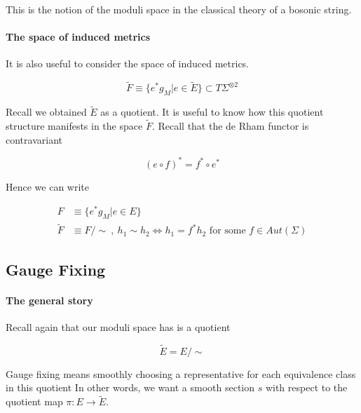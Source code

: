 \documentclass{article}
\begin{document}
            This is the notion of the moduli space in the classical theory of a bosonic string.

        \paragraph{The space of induced metrics} 

            It is also useful to consider the space of induced metrics.

            \begin{equation}
                \tilde F \equiv \{e^* g_M | e \in \tilde E \} \subset T\Sigma^{\otimes 2}
            \end{equation}

            Recall we obtained $\tilde E$ as a quotient. It is useful to know how this quotient structure manifests in the space $\tilde F$. Recall that the de Rham functor is contravariant

            \begin{equation}
                (e \circ f)^* = f^* \circ e^*
            \end{equation}

            Hence we can write

            \begin{align}
                F &\equiv \{ e^*g_M | e \in E \}\\
                \tilde F &\equiv F / \sim ~,~ h_1 \sim h_2 \iff h_1 = f^* h_2 \text{ for some } f \in Aut(\Sigma)
            \end{align}

        \subsection{Gauge Fixing}
            \paragraph{The general story}

                Recall again that our moduli space has is a quotient

                \begin{equation}
                    \tilde E = E / \sim
                \end{equation}

                Gauge fixing means smoothly choosing a representative for each equivalence class in this quotient In other words, we want a smooth section $s$ with respect to the quotient map $\pi: E \to \tilde E$.
\end{document}
